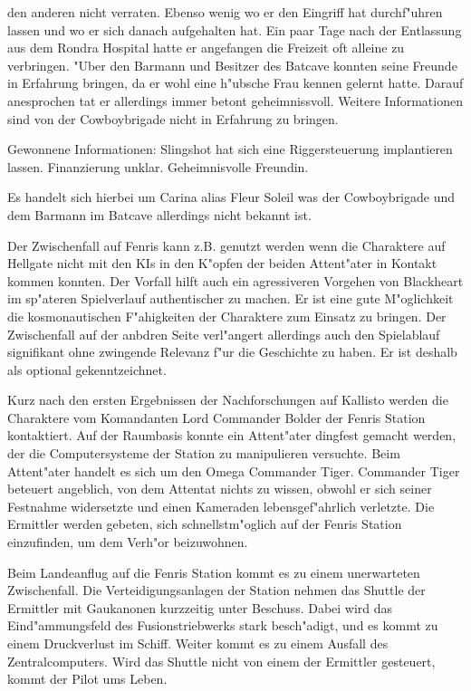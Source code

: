 den anderen nicht verraten. Ebenso wenig wo er den Eingriff hat durchf"uhren lassen und wo er sich danach aufgehalten hat. Ein paar Tage nach der Entlassung aus dem Rondra Hospital hatte er angefangen die Freizeit oft alleine zu verbringen. "Uber den Barmann und Besitzer des Batcave konnten seine Freunde in Erfahrung bringen, da\3 er wohl eine h"ubsche Frau kennen gelernt hatte. Darauf anesprochen tat er allerdings immer betont geheimnissvoll. Weitere Informationen sind von der Cowboybrigade  nicht in Erfahrung zu bringen.

\begin{remarks}
	Gewonnene Informationen: Slingshot hat sich eine Riggersteuerung implantieren lassen. Finanzierung unklar. Geheimnisvolle Freundin. 
	
	Es handelt sich hierbei um Carina alias Fleur Soleil was der Cowboybrigade und dem Barmann im Batcave allerdings nicht bekannt ist.
\end{remarks}


Der Zwischenfall auf Fenris kann z.B. genutzt werden wenn die Charaktere auf Hellgate nicht mit den KIs in den K"opfen der beiden Attent"ater in Kontakt kommen konnten. Der Vorfall hilft auch ein agressiveren Vorgehen von Blackheart im sp"ateren Spielverlauf authentischer zu machen. Er ist eine gute M"oglichkeit die kosmonautischen F"ahigkeiten der Charaktere zum Einsatz zu bringen. Der Zwischenfall auf der anbdren Seite verl"angert allerdings auch den Spielablauf signifikant ohne zwingende Relevanz f"ur die Geschichte zu haben. Er ist deshalb als optional gekenntzeichnet.

Kurz nach den ersten Ergebnissen der Nachforschungen auf Kallisto werden die Charaktere vom Komandanten Lord Commander Bolder der Fenris Station kontaktiert. Auf der Raumbasis konnte ein Attent"ater dingfest gemacht werden, der die Computersysteme der Station zu manipulieren versuchte. Beim Attent"ater handelt es sich um den Omega Commander Tiger. Commander Tiger beteuert angeblich, von dem Attentat nichts zu wissen, obwohl er sich seiner Festnahme widersetzte und einen Kameraden lebensgef"ahrlich verletzte. Die Ermittler werden gebeten, sich schnellstm"oglich auf der Fenris Station einzufinden, um dem Verh"or beizuwohnen.

Beim Landeanflug auf die Fenris Station kommt es zu einem unerwarteten Zwischenfall. Die Verteidigungsanlagen der Station nehmen das Shuttle der Ermittler mit Gau\3kanonen kurzzeitig unter Beschuss. Dabei wird das Eind"ammungsfeld des Fusionstriebwerks stark besch"adigt, und es kommt zu einem Druckverlust im Schiff. Weiter kommt es zu einem Ausfall des Zentralcomputers. Wird das Shuttle nicht von einem der Ermittler gesteuert, kommt der Pilot ums Leben.

